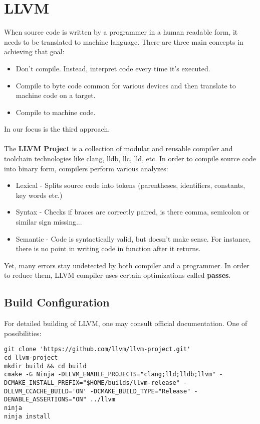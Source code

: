 \documentclass{report}
\begin{document}
\chapter *{\centering LLVM}

When source code is written by a programmer in a human readable form, it needs to be translated to machine language. There are three main concepts in achieving that goal:
\begin{itemize}
	\item Don't compile. Instead, interpret code every time it's executed.
	\item Compile to byte code common for various devices and then translate to machine code on a target.
	\item Compile to machine code.
\end{itemize}
In our focus is the third approach.
\\ \\
The \textbf{LLVM Project} is a collection of modular and reusable compiler and toolchain technologies like clang, lldb, llc, lld, etc.
In order to compile source code into binary form, compilers perform various analyzes:
\begin{itemize}
	\item Lexical - Splits source code into tokens (parentheses, identifiers, constants, key words etc.)
	\item Syntax - Checks if braces are correctly paired, is there comma, semicolon or similar sign missing...
	\item Semantic - Code is syntactically valid, but doesn't make sense. For instance, there is no point in writing code in function after it returns.    
\end{itemize}
Yet, many errors stay undetected by both compiler and a programmer.
In order to reduce them, LLVM compiler uses certain optimizations called \textbf{passes}.

\section *{Build Configuration}
For detailed building of LLVM, one may consult official documentation. 
One of possibilities:
\begin{verbatim}
git clone 'https://github.com/llvm/llvm-project.git'
cd llvm-project
mkdir build && cd build
cmake -G Ninja -DLLVM_ENABLE_PROJECTS="clang;lld;lldb;llvm" -DCMAKE_INSTALL_PREFIX="$HOME/builds/llvm-release" -DLLVM_CCACHE_BUILD='ON' -DCMAKE_BUILD_TYPE="Release" -DENABLE_ASSERTIONS="ON" ../llvm
ninja
ninja install
\end{verbatim}
\end{document}

